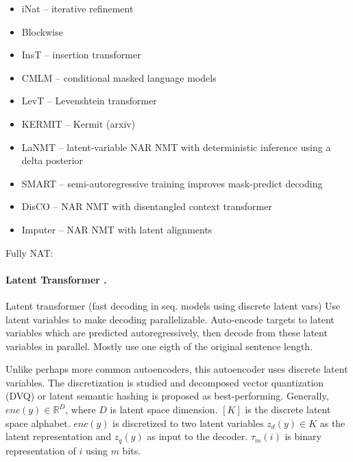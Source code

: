 

\begin{itemize}
\item iNat \citep{lee2018deterministic} -- iterative refinement
\item Blockwise \citep{stern2018blockwise}
\item InsT \citep{stern2019insertion} -- insertion transformer
\item CMLM \citep{ghazvininejad2019mask} -- conditional masked language models
\item LevT \citep{gu2019levenshtein} -- Levenshtein transformer
\item KERMIT \citep{chan2019kermit} -- Kermit (arxiv)
\item LaNMT \citep{shu2020latent} -- latent-variable NAR NMT with deterministic inference using a delta posterior
\item SMART \citep{ghazvininejad2020semiautoregressive} -- semi-autoregressive training improves mask-predict decoding
\item DisCO \citep{kasai2020nonautoregressive} -- NAR NMT with disentangled context transformer
\item Imputer \citep{saharia2020nonautoregressive} -- NAR NMT with latent alignments
\end{itemize}

Fully NAT:



\paragraph{Latent Transformer \citep{kaiser2018fast}.} Latent transformer (fast
decoding in seq. models using discrete latent vars) Use latent variables to make
decoding parallelizable. Auto-encode targets to latent variables which are
predicted autoregressively, then decode from these latent variables in
parallel. Mostly use one eigth of the original sentence length.

Unlike perhaps more common autoencoders, this autoencoder uses discrete latent
variables.  The discretization is studied and decomposed vector quantization
(DVQ) or latent semantic hashing is proposed as best-performing. Generally,
$enc(y) \in \mathbb{R}^D$, where $D$ is latent space dimension. $[K]$ is the
discrete latent space alphabet. $enc(y)$ is discretized to two latent variables
$z_d(y) \in K$ as the latent representation and $z_q(y)$ as input to the
decoder. $\tau_m(i)$ is binary representation of $i$ using $m$ bits.

